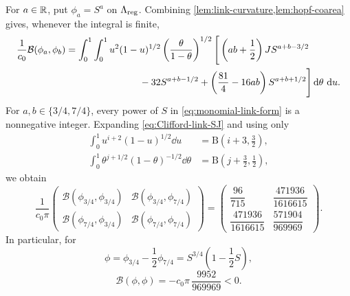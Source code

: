 For $a\in\mathbb R$, put $\phi_a=S^a$ on $\Lambda_{\mathrm{reg}}$.  Combining
\cref{lem:link-curvature,lem:hopf-coarea} gives, whenever the
integral is finite,
\begin{align}
 \frac1{c_0}\mathcal B(\phi_a,\phi_b)
 &=\int_0^1\int_0^1
    u^2(1-u)^{1/2}
    \left(\frac{\theta}{1-\theta}\right)^{1/2}
    \Bigg[
       \left(ab+\frac12\right)JS^{a+b-3/2}              \notag\\
 &\hspace{27mm}
       -32S^{a+b-1/2}
       +\left(\frac{81}{4}-16ab\right)S^{a+b+1/2}
    \Bigg]\dd\theta\,\dd u.
 \label{eq:monomial-link-form}
\end{align}
For $a,b\in\{3/4,7/4\}$, every power of $S$ in
\eqref{eq:monomial-link-form} is a nonnegative integer.  Expanding
\eqref{eq:Clifford-link-SJ} and using only
\begin{align*}
 \int_0^1u^{i+2}(1-u)^{1/2}\dd u
   &=\mathrm B\left(i+3,\frac32\right),\\
 \int_0^1\theta^{j+1/2}(1-\theta)^{-1/2}\dd\theta
   &=\mathrm B\left(j+\frac32,\frac12\right),
\end{align*}
we obtain
\[
 \frac1{c_0\pi}
 \begin{pmatrix}
  \mathcal B(\phi_{3/4},\phi_{3/4})
   &\mathcal B(\phi_{3/4},\phi_{7/4})\\
  \mathcal B(\phi_{7/4},\phi_{3/4})
   &\mathcal B(\phi_{7/4},\phi_{7/4})
 \end{pmatrix}
 =
 \begin{pmatrix}
  \dfrac{96}{715}
   &\dfrac{471936}{1616615}\\[2mm]
  \dfrac{471936}{1616615}
   &\dfrac{571904}{969969}
 \end{pmatrix}.
\]
In particular, for
\[
 \phi=\phi_{3/4}-\frac12\phi_{7/4}
      =S^{3/4}\left(1-\frac12S\right),
\]
\begin{equation}\label{eq:negative-link-form}
 \mathcal B(\phi,\phi)
 =-c_0\pi\,\frac{9952}{969969}<0.
\end{equation}

